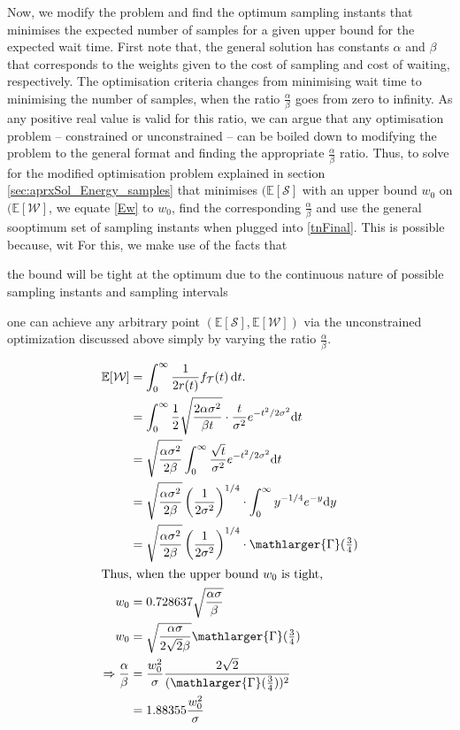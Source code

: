 Now, we modify the problem and find the optimum sampling instants that minimises the expected number of samples for a given upper bound for the expected wait time. First note that, the general solution has constants $\alpha$ and $\beta$ that corresponds to the weights given to the cost of sampling and cost of waiting, respectively. The optimisation criteria changes from minimising wait time to minimising the number of samples, when the ratio $\frac{\alpha}{\beta}$ goes from zero to infinity. As any positive real value is valid for this ratio, we can argue that any optimisation problem -- constrained or unconstrained -- can be boiled down to modifying the problem to the general format and finding the appropriate $\frac{\alpha}{\beta}$ ratio. Thus, to solve for the modified optimisation problem explained in section \ref{sec:aprxSol_Energy_samples} that minimises $(\mathbb{E}[\mathcal{S}]$ with an upper bound $w_0$ on $(\mathbb{E}[\mathcal{W}]$, we equate \cref{Ew} to $w_0$, find the corresponding $\frac{\alpha}{\beta}$ and use the general sooptimum set of sampling instants when plugged into \cref{tnFinal}. This is possible because, wit
For this, we make use of the facts that
\begin{enumerate*}[itemjoin={{, }}, itemjoin*={{, and }}]
    \item the bound will be tight at the optimum due to the continuous nature of possible sampling instants and sampling intervals
    \item one can achieve any arbitrary point $(\mathbb{E}[\mathcal{S}],\mathbb{E}[\mathcal{W}])$ via the unconstrained optimization discussed above simply by varying the ratio $\frac{\alpha}{\beta}$.
\end{enumerate*}
\begin{alignat*}{1}
\mathbb{E}[\mathcal{W}]&=\int_{0}^{\infty}\dfrac{1}{2r(t)}f_\mathcal{T}(t)\,\mathrm{d}t.\nonumber\\
&=\int_{0}^{\infty}\frac{1}{2}\sqrt{\frac{2\alpha\sigma^2}{\beta t}}\cdot \frac{t}{\sigma^2}e^{-{t^2}/{2\sigma^2}}\mathrm{d}t\\
&=\sqrt{\frac{\alpha\sigma^2}{2\beta}}\int_{0}^{\infty}\frac{\sqrt{t}}{\sigma^2}e^{-{t^2}/{2\sigma^2}}\mathrm{d}t\\
&=\sqrt{\frac{\alpha\sigma^2}{2\beta}}\left({\frac{1}{{2}\sigma^2}}\right)^{1/4}\cdot\int_{0}^{\infty}y^{-1/4}e^{-y}\mathrm{d}y\\
&=\sqrt{\frac{\alpha\sigma^2}{2\beta}}\left({\frac{1}{{2}\sigma^2}}\right)^{1/4}\cdot\mathlarger{\Gamma}(\tfrac{3}{4})\\
\intertext{Thus, when the upper bound $w_0$ is tight,}
w_0&=0.728637\sqrt{\frac{\alpha\sigma}{\beta}}\\
w_0&=\sqrt{\frac{\alpha\sigma}{2\sqrt{2}\beta}}\mathlarger{\Gamma}(\tfrac{3}{4})\\
\Rightarrow\frac{\alpha}{\beta}&=\frac{w_0^2}{\sigma}\frac{2\sqrt{2}}{(\mathlarger{\Gamma}(\tfrac{3}{4}))^2}\\&=1.88355\frac{w_0^2}{\sigma}
\end{alignat*}
